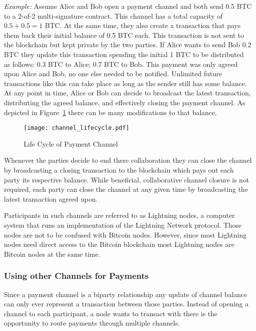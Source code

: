 \documentclass[final]{fhnwreport}       %
\begin{document}
\textit{Example:} Assume Alice and Bob open a payment channel and both send 0.5 BTC to a 2-of-2 multi-signature contract. This channel has a total capacity of $0.5 + 0.5 = 1$ BTC. At the same time, they also create a transaction that pays them back their initial balance of 0.5 BTC each. This transaction is not sent to the \gls{blockchain} but kept private by the two parties. If Alice wants to send Bob 0.2 BTC they update this transaction spending the initial 1 BTC to be distributed as follows: 0.3 BTC to Alice; 0.7 BTC to Bob. This payment was only agreed upon Alice and Bob, no one else needed to be notified. Unlimited future transactions like this can take place as long as the sender still has some balance. At any point in time, Alice or Bob can decide to broadcast the latest transaction, distributing the agreed balance, and effectively closing the payment channel. As depicted in Figure~\ref{fig:ChannelCycle} there can be many modifications to that balance.

\begin{figure}[H]
\centering
\texttt{[image: channel\_lifecycle.pdf]}
\caption{Life Cycle of Payment Channel}
\label{fig:ChannelCycle}
\end{figure}

Whenever the parties decide to end there collaboration they can close the channel by broadcasting a closing transaction to the \gls{blockchain} which pays out each party its respective balance. While beneficial, collaborative channel closure is not required, each party can close the channel at any given time by broadcasting the latest transaction agreed upon. 

Participants in such channels are referred to as Lightning nodes, a computer system that runs an implementation of the Lightning Network protocol. Those nodes are not to be confused with Bitcoin nodes. However, since most Lightning nodes need direct access to the Bitcoin \gls{blockchain} most Lightning nodes are Bitcoin nodes at the same time.

\subsubsection{Using other Channels for Payments}
Since a payment channel is a biparty relationship any update of channel balance can only ever represent a transaction between those parties. Instead of opening a channel to each participant, a node wants to transact with there is the opportunity to route payments through multiple channels.
\end{document}
